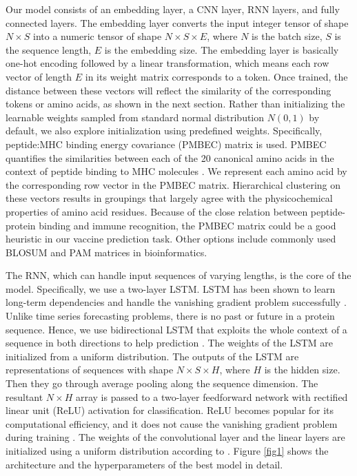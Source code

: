 \documentclass[conference]{IEEEtran}
\begin{document}
Our model consists of an embedding layer, a CNN layer, RNN layers, and fully connected layers. The embedding layer converts the input integer tensor of shape $N\times S$ into a numeric tensor of shape $N\times S\times E$, where $N$ is the batch size, $S$ is the sequence length, $E$ is the embedding size. The embedding layer is basically one-hot encoding followed by a linear transformation, which means each row vector of length $E$ in its weight matrix corresponds to a token. Once trained, the distance between these vectors will reflect the similarity of the corresponding tokens or amino acids, as shown in the next section. Rather than initializing the learnable weights sampled from standard normal distribution $N(0, 1)$ by default, we also explore initialization using predefined weights. Specifically, peptide:MHC binding energy covariance (PMBEC) matrix is used. PMBEC quantifies the similarities between each of the 20 canonical amino acids in the context of peptide binding to MHC molecules \cite{Kim_2009}. We represent each amino acid by the corresponding row vector in the PMBEC matrix. Hierarchical clustering on these vectors results in groupings that largely agree with the physicochemical properties of amino acid residues. Because of the close relation between peptide-protein binding and immune recognition, the PMBEC matrix could be a good heuristic in our vaccine prediction task. Other options include commonly used BLOSUM \cite{Henikoff_1992} and PAM \cite{dayhoff197822} matrices in bioinformatics.

The RNN, which can handle input sequences of varying lengths, is the core of the model. Specifically, we use a two-layer LSTM. LSTM has been shown to learn long-term dependencies and handle the vanishing gradient problem successfully \cite{Hochreiter_1997}. Unlike time series forecasting problems, there is no past or future in a protein sequence. Hence, we use bidirectional LSTM that exploits the whole context of a sequence in both directions to help prediction \cite{Graves}. The weights of the LSTM are initialized from a uniform distribution. The outputs of the LSTM are representations of sequences with shape $N\times S\times H$, where $H$ is the hidden size. Then they go through average pooling along the sequence dimension. The resultant $N\times H$ array is passed to a two-layer feedforward network with rectiﬁed linear unit (ReLU) activation for classification. ReLU becomes popular for its computational efficiency, and it does not cause the vanishing gradient problem during training \cite{glorot2011deep}. The weights of the convolutional layer and the linear layers are initialized using a uniform distribution according to \cite{He_2015}. Figure \ref{fig1} shows the architecture and the hyperparameters of the best model in detail.
\end{document}
